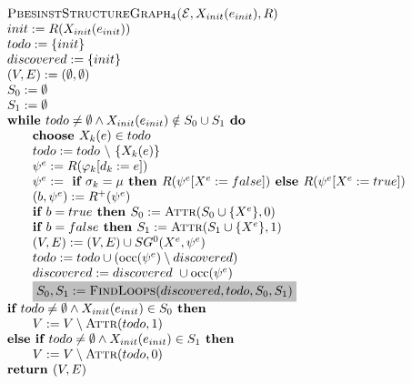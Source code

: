 \documentclass{article}
\begin{document}
\begin{equation*}
\begin{array}{l}
\textsc{PbesinstStructureGraph$_{4}$(}\mathcal{E}, X_{init}(e_{init}), R) \\ 
init:=R(X_{init}(e_{init})) \\
todo:=\{init\} \\
discovered:=\{init\} \\
(V,E) :=(\emptyset ,\emptyset ) \\ 
S_0:= \emptyset \\
S_1:= \emptyset \\
\textbf{while }todo \neq \emptyset \wedge X_{init}(e_{init}) \notin S_0 \cup S_1 \textbf{ do} \\ 
\qquad \text{\textbf{choose }}X_{k}(e)\in todo \\ 
\qquad todo:=todo\ \backslash \ \{X_{k}(e)\} \\ 
\qquad \psi ^{e}:=R(\varphi _{k}[d_{k}:=e]) \\ 
\qquad \psi^e := \textbf{ if } \sigma_k = \mu \textbf{ then } R(\psi^e[X^e := false])
\textbf{ else }  R(\psi^e[X^e := true]) \\
\qquad (b,\psi^e) := R^+(\psi^e) \\
\qquad \textbf{if $b = true$ then } S_0 := \textsc{Attr}(S_0 \cup \{ X^e \}, 0) \\
\qquad \textbf{if $b = false$ then } S_1 := \textsc{Attr}(S_1 \cup \{ X^e \}, 1) \\
\qquad (V,E) := (V,E) \cup SG^{0}(X^{e},\psi ^{e}) \\ 
\qquad todo:=todo\cup (\mathrm{occ}(\psi ^{e})\setminus discovered) \\
\qquad discovered:=discovered\ \cup \mathrm{occ}(\psi ^{e}) \\
\qquad \colorbox{lightgray}{$%
S_0, S_1 := \text{\textsc{FindLoops}}(discovered, todo, S_0, S_1) $}\\  %
\textbf{if } todo \neq \emptyset \land X_{init}(e_{init}) \in S_0 \textbf{ then }\\
\qquad V := V \setminus \textsc{Attr}(todo, 1) \\
\textbf{else if } todo \neq \emptyset \land X_{init}(e_{init}) \in S_1 \textbf{ then }\\
\qquad V := V \setminus \textsc{Attr}(todo, 0) \\
\text{\textbf{return }}(V, E)
\end{array}%
\end{equation*}%
\end{document}
